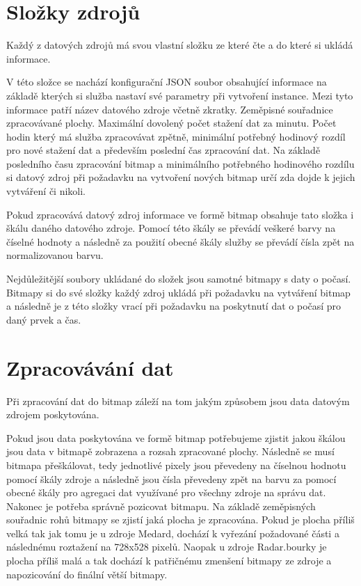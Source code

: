 \documentclass[czech,bachelor,dept460,male,csharp,cpdeclaration]{diploma}
\begin{document}
	\section{Složky zdrojů}
	
	Každý z datových zdrojů má svou vlastní složku ze které čte a do které si ukládá informace.
	
	V této složce se nachází konfigurační JSON soubor obsahující informace na základě kterých si služba nastaví své parametry při vytvoření instance. Mezi tyto informace patří název datového zdroje včetně zkratky. Zeměpisné souřadnice zpracovávané plochy. Maximální dovolený počet stažení dat za minutu. Počet hodin který má služba zpracovávat zpětně, minimální potřebný hodinový rozdíl pro nové stažení dat a především poslední čas zpracování dat. Na základě posledního času zpracování bitmap a minimálního potřebného hodinového rozdílu si datový zdroj při požadavku na vytvoření nových bitmap určí zda dojde k jejich vytváření či nikoli.
	
	Pokud zpracovává datový zdroj informace ve formě bitmap obsahuje tato složka i škálu daného datového zdroje. Pomocí této škály se převádí veškeré barvy na číselné hodnoty a následně za použití obecné škály služby se převádí čísla zpět na normalizovanou barvu.
	
	Nejdůležitější soubory ukládané do složek jsou samotné bitmapy s daty o počasí. Bitmapy si do své složky každý zdroj ukládá při požadavku na vytváření bitmap a následně je z této složky vrací při požadavku na poskytnutí dat o počasí pro daný prvek a čas.
	
	\section{Zpracovávání dat}
	
	Při zpracování dat do bitmap záleží na tom jakým způsobem jsou data datovým zdrojem poskytována.
	
	Pokud jsou data poskytována ve formě bitmap potřebujeme zjistit jakou škálou jsou data v bitmapě zobrazena a rozsah zpracované plochy. Následně se musí bitmapa přeškálovat, tedy jednotlivé pixely jsou převedeny na číselnou hodnotu pomocí škály zdroje a následně jsou čísla převedeny zpět na barvu za pomocí obecné škály pro agregaci dat využívané pro všechny zdroje na správu dat. Nakonec je potřeba správně pozicovat bitmapu. Na základě zeměpisných souřadnic rohů bitmapy se zjistí jaká plocha je zpracována. Pokud je plocha příliš velká tak jak tomu je u zdroje Medard, dochází k vyřezání požadované části a následnému roztažení na 728x528 pixelů. Naopak u zdroje Radar.bourky je plocha příliš malá a tak dochází k patřičnému zmenšení bitmapy ze zdroje a napozicování do finální větší bitmapy.
	
\end{document}
